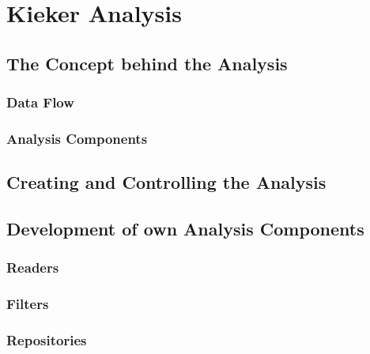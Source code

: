 \chapter{Kieker Analysis}\label{chp:Kieker-Analysis}
	\section{The Concept behind the Analysis}
		\subsection{Data Flow}
		\subsection{Analysis Components}
	\section{Creating and Controlling the Analysis}
	\section{Development of own Analysis Components}
		\subsection{Readers}
		\subsection{Filters}
		\subsection{Repositories}